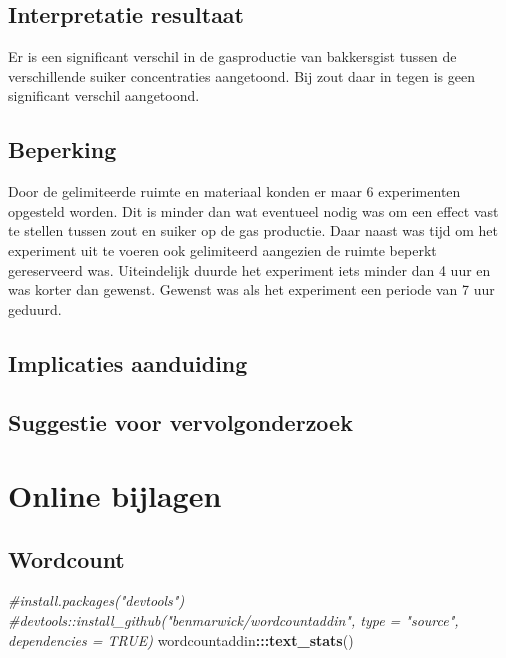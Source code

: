 \documentclass[
]{article}
\newenvironment{Shaded}{\begin{snugshade}}{\end{snugshade}}
\newcommand{\CommentTok}[1]{\textcolor[rgb]{0.56,0.35,0.01}{\textit{#1}}}
\newcommand{\FunctionTok}[1]{\textcolor[rgb]{0.13,0.29,0.53}{\textbf{#1}}}
\newcommand{\NormalTok}[1]{#1}
\newcommand{\SpecialCharTok}[1]{\textcolor[rgb]{0.81,0.36,0.00}{\textbf{#1}}}
\begin{document}
\subsection{Interpretatie resultaat}\label{interpretatie-resultaat}

Er is een significant verschil in de gasproductie van bakkersgist tussen de verschillende suiker concentraties aangetoond. Bij zout daar in tegen is geen significant verschil aangetoond.

\subsection{Beperking}\label{beperking}

Door de gelimiteerde ruimte en materiaal konden er maar 6 experimenten opgesteld worden. Dit is minder dan wat eventueel nodig was om een effect vast te stellen tussen zout en suiker op de gas productie. Daar naast was tijd om het experiment uit te voeren ook gelimiteerd aangezien de ruimte beperkt gereserveerd was. Uiteindelijk duurde het experiment iets minder dan 4 uur en was korter dan gewenst. Gewenst was als het experiment een periode van 7 uur geduurd.

\subsection{Implicaties aanduiding}\label{implicaties-aanduiding}

\subsection{Suggestie voor vervolgonderzoek}\label{suggestie-voor-vervolgonderzoek}

\section{Online bijlagen}\label{online-bijlagen}

\subsection{Wordcount}\label{wordcount}

\begin{Shaded}
\begin{Highlighting}[]
\CommentTok{\#install.packages("devtools")}
\CommentTok{\#devtools::install\_github("benmarwick/wordcountaddin", type = "source", dependencies = TRUE)}
\NormalTok{wordcountaddin}\SpecialCharTok{:::}\FunctionTok{text\_stats}\NormalTok{()}
\end{Highlighting}
\end{Shaded}
\end{document}
